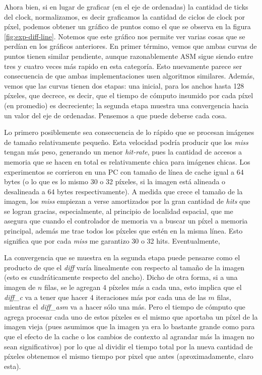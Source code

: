 Ahora bien, si en lugar de graficar (en el eje de ordenadas) la cantidad de ticks del clock, normalizamos, es decir graficamos la cantidad de ciclos de clock por píxel, podemos obtener un gráfico de puntos como el que se observa en la figura \ref{fig:exp-diff-line}. Notemos que este gráfico nos permite ver varias cosas que se perdían en los gráficos anteriores. En primer término, vemos que ambas curvas de puntos tienen similar pendiente, aunque razonablemente ASM sigue siendo entre tres y cuatro veces más rapido en esta categoría. Esto nuevamente parece ser consecuencia de que ambas implementaciones usen algoritmos similares. Además, vemos que las curvas tienen dos etapas: una inicial, para los anchos hasta 128 píxeles, que decrece, es decir, que el tiempo de cómputo insumido por cada píxel (en promedio) es decreciente; la segunda etapa muestra una convergencia hacia un valor del eje de ordenadas. Pensemos a que puede deberse cada cosa.

Lo primero posiblemente sea consecuencia de lo rápido que se procesan imágenes de tamaño relativamente pequeño. Esta velocidad podría producir que los \emph{miss} tengan más peso, generando un menor \emph{hit-rate}, pues la cantidad de accesos a memoria que se hacen en total es relativamente chica para imágenes chicas. Los experimentos se corrieron en una PC con tamaño de línea de cache igual a 64 bytes (o lo que es lo mismo 30 o 32 píxeles, si la imagen está alineada o desalineada a 64 bytes respectivamente). A medida que crece el tamaño de la imagen, los \emph{miss} empiezan a verse amortizados por la gran cantidad de \emph{hits} que se logran gracias, especialmente, al principio de localidad espacial, que me asegura que cuando el controlador de memoria va a buscar un píxel a memoria principal, además me trae todos los píxeles que estén en la misma línea. Esto significa que por cada \emph{miss} me garantizo 30 o 32 hits. Eventualmente, 

La convergencia que se muestra en la segunda etapa puede pensarse como el producto de que el \emph{diff} varía linealmente con respecto al tamaño de la imagen (esto es cuadráticamente respecto del ancho). Dicho de otra forma, si a una imagen de $n$ filas, se le agregan 4 píxeles más a cada una, esto implica que el \emph{diff\_c} va a tener que hacer 4 iteraciones más por cada una de las $m$ filas, mientras el \emph{diff\_asm} va a hacer sólo una más. Pero el tiempo de cómputo que agrega procesar cada uno de estos píxeles es el mismo que aportaba un píxel de la imagen vieja (pues asumimos que la imagen ya era lo bastante grande como para que el efecto de la cache o los cambios de contexto al agrandar más la imagen no sean significativos) por lo que al dividir el tiempo total por la nueva cantidad de píxeles obtenemos el mismo tiempo por pixel que antes (aproximadamente, claro esta).

